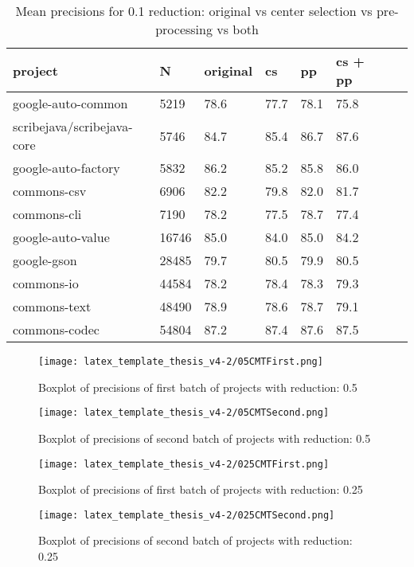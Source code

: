 \documentclass[twoside]{uva-inf-bachelor-thesis}
\begin{document}
\begin{table}[h]
    \centering
    \begin{tabular}{|l|l|l|l|l|l|l|l|}
    \hline
        project & N & original & cs & pp & cs + pp \\ \hline
        google-auto-common & 5219 & 78.6 & 77.7 & 78.1 & 75.8 \\ \hline
        scribejava/scribejava-core & 5746 & 84.7 & 85.4 & 86.7 & 87.6 \\ \hline
        google-auto-factory & 5832 & 86.2 & 85.2 & 85.8 & 86.0 \\ \hline
        commons-csv & 6906 & 82.2 & 79.8 & 82.0 & 81.7 \\ \hline
        commons-cli & 7190 & 78.2 & 77.5 & 78.7 & 77.4 \\ \hline
        google-auto-value & 16746 & 85.0 & 84.0 & 85.0 & 84.2 \\ \hline
        google-gson & 28485 & 79.7 & 80.5 & 79.9 & 80.5 \\ \hline
        commons-io & 44584 & 78.2 & 78.4 & 78.3 & 79.3 \\ \hline
        commons-text & 48490 & 78.9 & 78.6 & 78.7 & 79.1 \\ \hline
        commons-codec & 54804 & 87.2 & 87.4 & 87.6 & 87.5 \\ \hline
    \end{tabular}
    \label{tab:01CMT}
\caption{Mean precisions for 0.1 reduction: original vs center selection vs pre-processing vs both}
\end{table}
\clearpage
\begin{figure}[h!]
    \centering
    \texttt{[image: latex\_template\_thesis\_v4-2/05CMTFirst.png]}
    \caption{Boxplot of precisions of first batch of projects with reduction: 0.5}
    \label{fig:boxplot05-1}
\end{figure}
\begin{figure}[h!]
    \centering
    \texttt{[image: latex\_template\_thesis\_v4-2/05CMTSecond.png]}
    \caption{Boxplot of precisions of second batch of projects with reduction: 0.5}
    \label{fig:boxplot05-2}
\end{figure}
\begin{figure}[h!]
    \centering
    \texttt{[image: latex\_template\_thesis\_v4-2/025CMTFirst.png]}
    \caption{Boxplot of precisions of first batch of projects with reduction: 0.25}
    \label{fig:boxplot025-1}
\end{figure}
\begin{figure}[h!]
    \centering
    \texttt{[image: latex\_template\_thesis\_v4-2/025CMTSecond.png]}
    \caption{Boxplot of precisions of second batch of projects with reduction: 0.25}
    \label{fig:boxplot025-2}
\end{figure}
\end{document}
